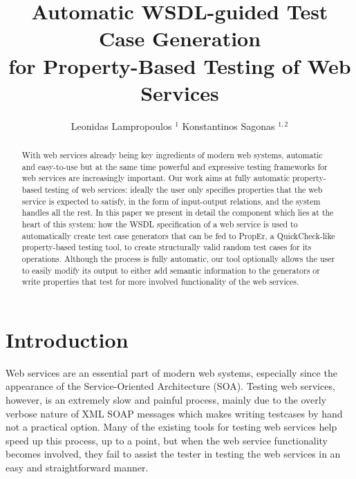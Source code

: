 \documentclass[submission,copyright]{eptcs}
\title{Automatic WSDL-guided Test Case Generation\\
       for Property-Based Testing of Web Services}
\author{Leonidas Lampropoulos $^{1}$ \hspace*{2em} Konstantinos Sagonas $^{1,2}$
\institute{%
  $^{1}$ School of Electrical and Computer Engineering,
  National Technical University of Athens, Greece\\
  $^{2}$ Department of Information Technology, Uppsala University, Sweden
}
}
\begin{document}
\maketitle

\begin{abstract}
With web services already being key ingredients of modern web systems,
automatic and easy-to-use but at the same time powerful and expressive
testing frameworks for web services are increasingly important. Our
work aims at fully automatic property-based testing of web services:
ideally the user only specifies properties that the web service is
expected to satisfy, in the form of input-output relations, and the
system handles all the rest. In this paper we present in detail the
component which lies at the heart of this system: how the WSDL
specification of a web service is used to automatically create test
case generators that can be fed to PropEr, a QuickCheck-like
property-based testing tool, to create structurally valid random
test cases for its operations. Although the process is fully automatic,
our tool optionally allows the user to easily modify its output to
either add semantic information to the generators or write properties
that test for more involved functionality of the web services.
\end{abstract}


\section{Introduction} \label{sec:intro}


Web services are an essential part of modern web systems, especially
since the appearance of the Service-Oriented Architecture (SOA).
Testing web services, however, is an extremely slow and painful
process, mainly due to the overly verbose nature of XML SOAP messages
which makes writing testcases by hand not a practical option. Many of
the existing tools for testing web services help speed up this
process, up to a point, but when the web service functionality becomes
involved, they fail to assist the tester in testing the web services
in an easy and straightforward manner.

\end{document}
